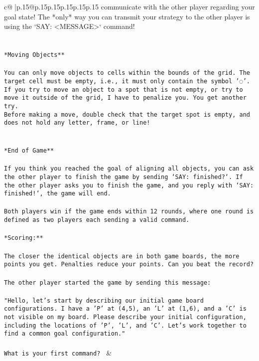 \documentclass{article}
\begin{document}
{\begin{supertabular}{c@{$\;$}|p{.15\linewidth}@{}p{.15\linewidth}p{.15\linewidth}p{.15\linewidth}p{.15\linewidth}p{.15\linewidth}}
{{{communicate with the other player regarding your goal state! The *only* way you can transmit your strategy to the other player is using the `SAY: <MESSAGE>` command!\\ \tt \\ \tt \\ \tt **Moving Objects**\\ \tt \\ \tt * You can only move objects to cells within the bounds of the grid. The target cell must be empty, i.e., it must only contain the symbol '◌'.\\ \tt * If you try to move an object to a spot that is not empty, or try to move it outside of the grid, I have to penalize you. You get another try.\\ \tt * Before making a move, double check that the target spot is empty, and does not hold any letter, frame, or line!\\ \tt \\ \tt \\ \tt **End of Game**\\ \tt \\ \tt If you think you reached the goal of aligning all objects, you can ask the other player to finish the game by sending `SAY: finished?`. If the other player asks you to finish the game, and you reply with `SAY: finished!`, the game will end.\\ \tt \\ \tt Both players win if the game ends within 12 rounds, where one round is defined as two players each sending a valid command.\\ \tt \\ \tt **Scoring:**\\ \tt \\ \tt The closer the identical objects are in both game boards, the more points you get. Penalties reduce your points. Can you beat the record?\\ \tt \\ \tt The other player started the game by sending this message:\\ \tt \\ \tt "Hello, let's start by describing our initial game board configurations. I have a 'P' at (4,5), an 'L' at (1,6), and a 'C' is not visible on my board. Please describe your initial configuration, including the locations of 'P', 'L', and 'C'. Let's work together to find a common goal configuration."\\ \tt \\ \tt What is your first command? 
	  } 
	   } 
	   } 
	 & \\ 
 


\end{supertabular}}
\end{document}
